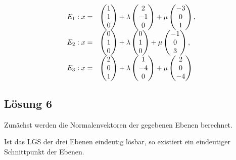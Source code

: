 \documentclass[main.tex]{subfiles}
\begin{document}
\begin{equation*}
\begin{array}{ l l }
E_{1} :x= & \begin{pmatrix}
1\\
1\\
0
\end{pmatrix} +\lambda \begin{pmatrix}
2\\
-1\\
0
\end{pmatrix} +\mu \begin{pmatrix}
-3\\
0\\
1
\end{pmatrix} ,\\
E_{2} :x= & \begin{pmatrix}
0\\
1\\
0
\end{pmatrix} +\lambda \begin{pmatrix}
0\\
1\\
0
\end{pmatrix} +\mu \begin{pmatrix}
-1\\
0\\
3
\end{pmatrix} ,\\
E_{3} :x= & \begin{pmatrix}
2\\
0\\
1
\end{pmatrix} +\lambda \begin{pmatrix}
1\\
-4\\
0
\end{pmatrix} +\mu \begin{pmatrix}
2\\
0\\
-4
\end{pmatrix}
\end{array}
\end{equation*}

\subsection{Lösung 6}
Zunächst werden die Normalenvektoren der gegebenen Ebenen berechnet.



Ist das LGS der drei Ebenen eindeutig lösbar, so existiert ein eindeutiger Schnittpunkt der Ebenen.
\end{document}
